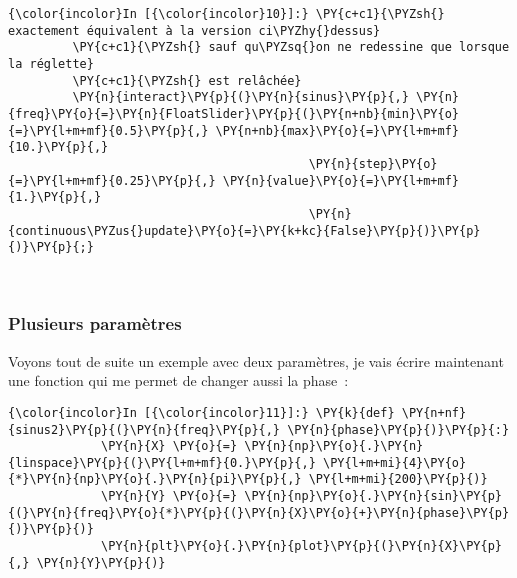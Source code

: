     \begin{Verbatim}[commandchars=\\\{\}]
{\color{incolor}In [{\color{incolor}10}]:} \PY{c+c1}{\PYZsh{} exactement équivalent à la version ci\PYZhy{}dessus}
         \PY{c+c1}{\PYZsh{} sauf qu\PYZsq{}on ne redessine que lorsque la réglette}
         \PY{c+c1}{\PYZsh{} est relâchée}
         \PY{n}{interact}\PY{p}{(}\PY{n}{sinus}\PY{p}{,} \PY{n}{freq}\PY{o}{=}\PY{n}{FloatSlider}\PY{p}{(}\PY{n+nb}{min}\PY{o}{=}\PY{l+m+mf}{0.5}\PY{p}{,} \PY{n+nb}{max}\PY{o}{=}\PY{l+m+mf}{10.}\PY{p}{,} 
                                          \PY{n}{step}\PY{o}{=}\PY{l+m+mf}{0.25}\PY{p}{,} \PY{n}{value}\PY{o}{=}\PY{l+m+mf}{1.}\PY{p}{,}
                                          \PY{n}{continuous\PYZus{}update}\PY{o}{=}\PY{k+kc}{False}\PY{p}{)}\PY{p}{)}\PY{p}{;}
\end{Verbatim}


    \begin{center}
    \end{center}
    { \hspace*{\fill} \\}
    
    \hypertarget{plusieurs-paramuxe8tres}{%
\subsubsection{Plusieurs paramètres}\label{plusieurs-paramuxe8tres}}

    Voyons tout de suite un exemple avec deux paramètres, je vais écrire
maintenant une fonction qui me permet de changer aussi la phase~:

    \begin{Verbatim}[commandchars=\\\{\}]
{\color{incolor}In [{\color{incolor}11}]:} \PY{k}{def} \PY{n+nf}{sinus2}\PY{p}{(}\PY{n}{freq}\PY{p}{,} \PY{n}{phase}\PY{p}{)}\PY{p}{:}
             \PY{n}{X} \PY{o}{=} \PY{n}{np}\PY{o}{.}\PY{n}{linspace}\PY{p}{(}\PY{l+m+mf}{0.}\PY{p}{,} \PY{l+m+mi}{4}\PY{o}{*}\PY{n}{np}\PY{o}{.}\PY{n}{pi}\PY{p}{,} \PY{l+m+mi}{200}\PY{p}{)}
             \PY{n}{Y} \PY{o}{=} \PY{n}{np}\PY{o}{.}\PY{n}{sin}\PY{p}{(}\PY{n}{freq}\PY{o}{*}\PY{p}{(}\PY{n}{X}\PY{o}{+}\PY{n}{phase}\PY{p}{)}\PY{p}{)}
             \PY{n}{plt}\PY{o}{.}\PY{n}{plot}\PY{p}{(}\PY{n}{X}\PY{p}{,} \PY{n}{Y}\PY{p}{)}
\end{Verbatim}


